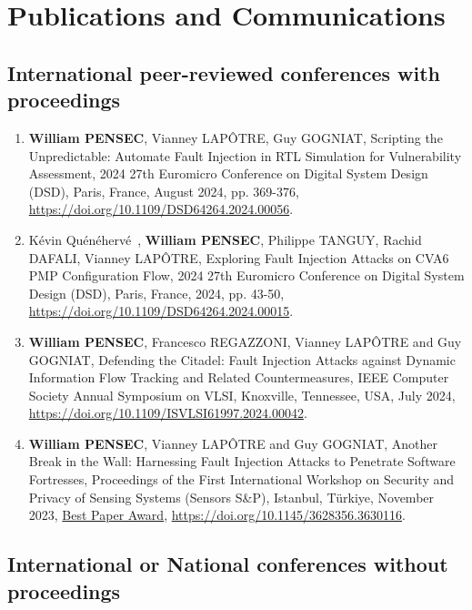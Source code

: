 \chapter{Publications and Communications}
\label{chapter:publi}
\section{International peer-reviewed conferences with proceedings}

\begin{enumerate}
    \item \textbf{William PENSEC}, Vianney LAPÔTRE, Guy GOGNIAT, Scripting the Unpredictable: Automate Fault Injection in RTL Simulation for Vulnerability Assessment, 2024 27th Euromicro Conference on Digital System Design (DSD), Paris, France, August 2024, pp. 369-376, \url{https://doi.org/10.1109/DSD64264.2024.00056}.
    \item Kévin Quénéhervé~\cite{QPTDL-24-dsd}, \textbf{William PENSEC}, Philippe TANGUY, Rachid DAFALI, Vianney LAPÔTRE, Exploring Fault Injection Attacks on CVA6 PMP Configuration Flow, 2024 27th Euromicro Conference on Digital System Design (DSD), Paris, France, 2024, pp. 43-50, \url{https://doi.org/10.1109/DSD64264.2024.00015}.
    \item \textbf{William PENSEC}, Francesco REGAZZONI, Vianney LAPÔTRE and Guy GOGNIAT, Defending the Citadel: Fault Injection Attacks against Dynamic Information Flow Tracking and Related Countermeasures, IEEE Computer Society Annual Symposium on VLSI, Knoxville, Tennessee, USA, July 2024, \url{https://doi.org/10.1109/ISVLSI61997.2024.00042}.
    \item\textbf{William PENSEC}, Vianney LAPÔTRE and Guy GOGNIAT, Another Break in the Wall: Harnessing Fault Injection Attacks to Penetrate Software Fortresses, Proceedings of the First International Workshop on Security and Privacy of Sensing Systems (Sensors S\&P), Istanbul, Türkiye, November 2023, \underline{Best Paper Award}, \url{https://doi.org/10.1145/3628356.3630116}.
\end{enumerate}
\section{International or National conferences without proceedings}

